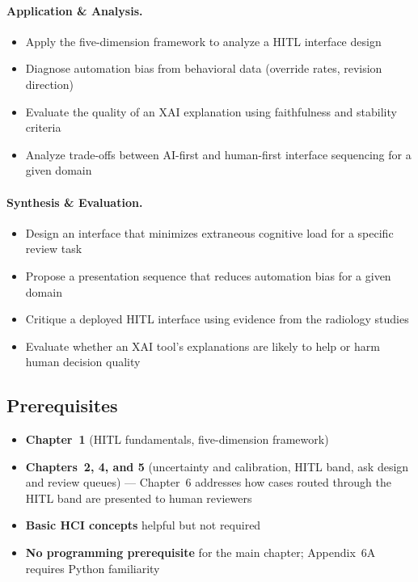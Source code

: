 \paragraph{Application \& Analysis.}
\begin{itemize}
    \item Apply the five-dimension framework to analyze a HITL interface design
    \item Diagnose automation bias from behavioral data (override rates, revision direction)
    \item Evaluate the quality of an XAI explanation using faithfulness and stability criteria
    \item Analyze trade-offs between AI-first and human-first interface sequencing for a given domain
\end{itemize}

\paragraph{Synthesis \& Evaluation.}
\begin{itemize}
    \item Design an interface that minimizes extraneous cognitive load for a specific review task
    \item Propose a presentation sequence that reduces automation bias for a given domain
    \item Critique a deployed HITL interface using evidence from the radiology studies
    \item Evaluate whether an XAI tool's explanations are likely to help or harm human decision quality
\end{itemize}

\subsection{Prerequisites}
\begin{itemize}
    \item \textbf{Chapter~1} (HITL fundamentals, five-dimension framework)
    \item \textbf{Chapters~2, 4, and 5} (uncertainty and calibration, HITL band, ask design and review queues) --- Chapter~6 addresses how cases routed through the HITL band are presented to human reviewers
    \item \textbf{Basic HCI concepts} helpful but not required
    \item \textbf{No programming prerequisite} for the main chapter; Appendix~6A requires Python familiarity
\end{itemize}

